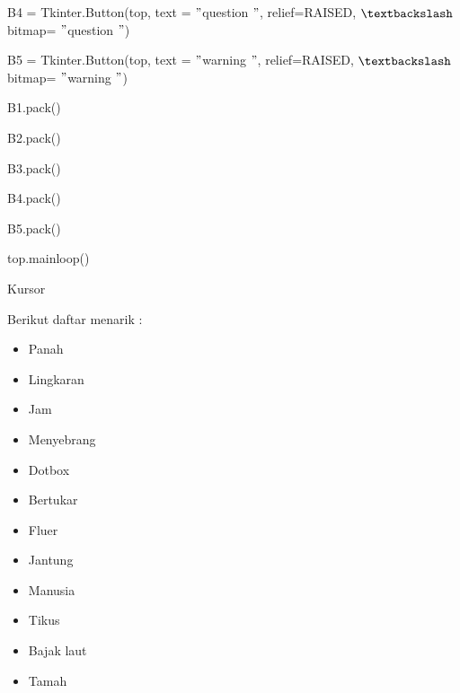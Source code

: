\documentclass{wileySix}
\begin{document}
\begin{myEnumerate}
{\begin{myEnumerate}
	{\fontsize{10pt}{10pt}\selectfont B4 = Tkinter.Button(top, text = $ " $question $ " $, relief=RAISED,  $  \textbackslash  $ bitmap= $ " $question $ " $)} \par
	{\fontsize{10pt}{10pt}\selectfont B5 = Tkinter.Button(top, text = $ " $warning $ " $, relief=RAISED,  $  \textbackslash  $ bitmap= $ " $warning $ " $)} \par
	\vspace{10pt}
	{\fontsize{10pt}{10pt}\selectfont B1.pack()} \par
	{\fontsize{10pt}{10pt}\selectfont B2.pack()} \par
	{\fontsize{10pt}{10pt}\selectfont B3.pack()} \par
	{\fontsize{10pt}{10pt}\selectfont B4.pack()} \par
	{\fontsize{10pt}{10pt}\selectfont B5.pack()} \par
	{\fontsize{10pt}{10pt}\selectfont top.mainloop()} \par
	\noindent 
	\item Kursor \par
	\noindent 
	Berikut daftar menarik : \par
	\noindent 
	\begin{itemize}
		\item Panah \par
		\noindent 
		\item Lingkaran \par
		\noindent 
		\item Jam \par
		\noindent 
		\item Menyebrang \par
		\noindent 
		\item Dotbox \par
		\noindent 
		\item Bertukar \par
		\noindent 
		\item Fluer \par
		\noindent 
		\item Jantung \par
		\noindent 
		\item Manusia \par
		\noindent 
		\item Tikus \par
		\noindent 
		\item Bajak laut \par
		\noindent 
		\item Tamah \par

\end{itemize}
\end{myEnumerate}}
\end{myEnumerate}
\end{document}
